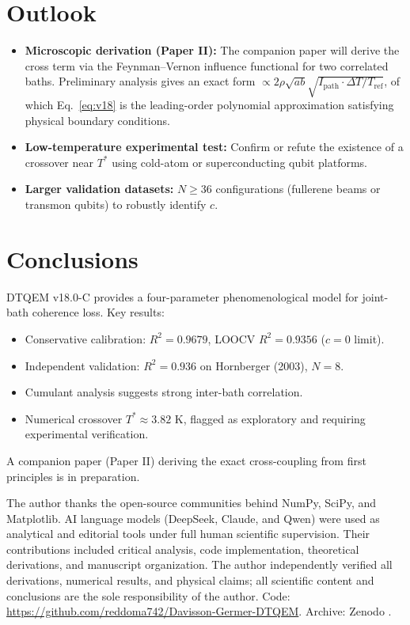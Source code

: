 \documentclass[aps,pra,reprint,amsmath,amssymb,superscriptaddress]{revtex4-2}
\begin{document}
\section{Outlook}
\begin{itemize}
    \item \textbf{Microscopic derivation (Paper II):} The companion paper will derive the cross term via the Feynman--Vernon influence functional for two correlated baths. Preliminary analysis gives an exact form $\propto 2\rho\sqrt{ab}\sqrt{I_{\text{path}} \cdot \Delta T/T_{\text{ref}}}$, of which Eq.~\eqref{eq:v18} is the leading-order polynomial approximation satisfying physical boundary conditions.
    \item \textbf{Low-temperature experimental test:} Confirm or refute the existence of a crossover near $T^*$ using cold-atom or superconducting qubit platforms.
    \item \textbf{Larger validation datasets:} $N \geq 36$ configurations (fullerene beams or transmon qubits) to robustly identify $c$.
\end{itemize}

\section{Conclusions}
DTQEM v18.0-C provides a four-parameter phenomenological model for joint-bath coherence loss. Key results:
\begin{itemize}
    \item Conservative calibration: $R^2 = 0.9679$, LOOCV $R^2 = 0.9356$ ($c=0$ limit).
    \item Independent validation: $R^2 = 0.936$ on Hornberger (2003), $N=8$.
    \item Cumulant analysis suggests strong inter-bath correlation.
    \item Numerical crossover $T^* \approx 3.82$ K, flagged as exploratory and requiring experimental verification.
\end{itemize}
A companion paper (Paper II) deriving the exact cross-coupling from first principles is in preparation.

\begin{acknowledgments}
The author thanks the open-source communities behind NumPy, SciPy, and Matplotlib. AI language models (DeepSeek, Claude, and Qwen) were used as analytical and editorial tools under full human scientific supervision. Their contributions included critical analysis, code implementation, theoretical derivations, and manuscript organization. The author independently verified all derivations, numerical results, and physical claims; all scientific content and conclusions are the sole responsibility of the author. Code: \url{https://github.com/reddoma742/Davisson-Germer-DTQEM}. Archive: Zenodo \cite{Berramdane2026}.
\end{acknowledgments}
\end{document}

